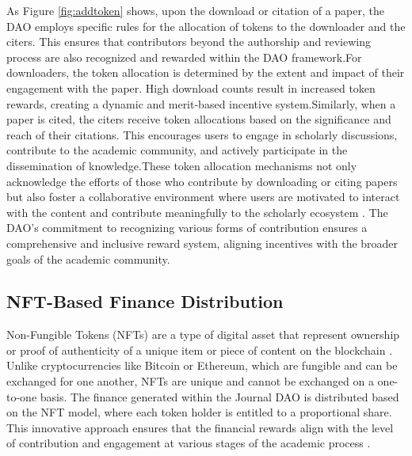 \documentclass[lettersize,journal]{IEEEtran}
\begin{document}
As Figure \ref{fig:addtoken} shows, upon the download or citation of a paper, the DAO employs specific rules for the allocation of tokens to the downloader and the citers. This ensures that contributors beyond the authorship and reviewing process are also recognized and rewarded within the DAO framework.For downloaders, the token allocation is determined by the extent and impact of their engagement with the paper. High download counts result in increased token rewards, creating a dynamic and merit-based incentive system.Similarly, when a paper is cited, the citers receive token allocations based on the significance and reach of their citations. This encourages users to engage in scholarly discussions, contribute to the academic community, and actively participate in the dissemination of knowledge.These token allocation mechanisms not only acknowledge the efforts of those who contribute by downloading or citing papers but also foster a collaborative environment where users are motivated to interact with the content and contribute meaningfully to the scholarly ecosystem \cite{9994617}. The DAO's commitment to recognizing various forms of contribution ensures a comprehensive and inclusive reward system, aligning incentives with the broader goals of the academic community.

\subsection{NFT-Based Finance Distribution}

Non-Fungible Tokens (NFTs) are a type of digital asset that represent ownership or proof of authenticity of a unique item or piece of content on the blockchain \cite{wang2021non}. Unlike cryptocurrencies like Bitcoin or Ethereum, which are fungible and can be exchanged for one another, NFTs are unique and cannot be exchanged on a one-to-one basis.
The finance generated within the Journal DAO is distributed based on the NFT model, where each token holder is entitled to a proportional share. This innovative approach ensures that the financial rewards align with the level of contribution and engagement at various stages of the academic process \cite{nadini2021mapping}.
\end{document}
